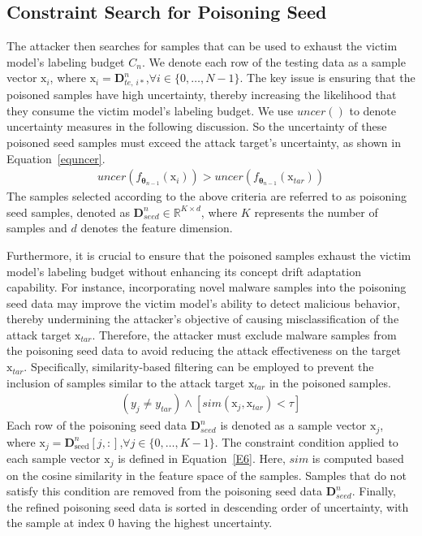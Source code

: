 \subsection{Constraint Search for Poisoning Seed}
The attacker then searches for samples that can be used to exhaust the victim model’s labeling budget $C_{n}$.
We denote each row of the testing data as a sample vector $\bm{\mathrm{x}}_{i}$, where $\bm{\mathrm{x}}_{i} = \bm{D}_{te,\,i*}^{n}$,$\forall i \in \{0, \dots, N-1\}$.
The key issue is ensuring that the poisoned samples have high uncertainty, thereby increasing the likelihood that they consume the victim model's labeling budget.
We use $uncer()$ to denote uncertainty measures in the following discussion.
So the uncertainty of these poisoned seed samples must exceed the attack target’s uncertainty, as shown in Equation~\ref{equncer}.
\begin{equation}
	\begin{aligned}
		uncer(f_{\bm{\theta}_{n-1}} \left( \bm{\mathrm{x}}_{i} \right)) > uncer(f_{\bm{\theta}_{n-1}} \left( \bm{\mathrm{x}}_{tar} \right))
	\end{aligned}
	\label{equncer}
\end{equation}
The samples selected according to the above criteria are referred to as poisoning seed samples, denoted as $\bm{D}_{seed}^{n} \in \mathbb{R}^{K \times d}$, where $K$ represents the number of samples and $d$ denotes the feature dimension.

Furthermore, it is crucial to ensure that the poisoned samples exhaust the victim model’s labeling budget without enhancing its concept drift adaptation capability.
For instance, incorporating novel malware samples into the poisoning seed data may improve the victim model’s ability to detect malicious behavior, thereby undermining the attacker’s objective of causing misclassification of the attack target $\bm{\mathrm{x}}_{tar}$.
Therefore, the attacker must exclude malware samples from the poisoning seed data to avoid reducing the attack effectiveness on the target $\bm{\mathrm{x}}_{tar}$.
Specifically, similarity-based filtering can be employed to prevent the inclusion of samples similar to the attack target $\bm{\mathrm{x}}_{tar}$ in the poisoned samples.
\begin{equation}
	\begin{aligned}
		(y_{j} \neq y_{tar}) \land [sim(\bm{\mathrm{x}}_{j},\bm{\mathrm{x}}_{tar})< \tau]
	\end{aligned}
	\label{E6}
\end{equation}
Each row of the poisoning seed data $\bm{D}_{seed}^{n}$ is denoted as a sample vector $\bm{\mathrm{x}}_{j}$, where $\bm{\mathrm{x}}_{j} = \bm{D}_{\text{seed}}^{n}[j,:]$,$\forall j \in \{0, \dots, K-1\}$.
The constraint condition applied to each sample vector $\bm{\mathrm{x}}_{j}$ is defined in Equation~\ref{E6}.
Here, $sim$ is computed based on the cosine similarity in the feature space of the samples.
Samples that do not satisfy this condition are removed from the poisoning seed data $\bm{D}_{seed}^{n}$.
Finally, the refined poisoning seed data is sorted in descending order of uncertainty, with the sample at index 0 having the highest uncertainty.

